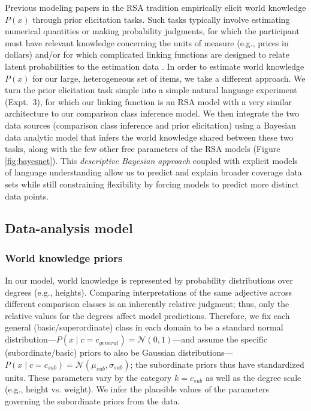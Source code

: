 \documentclass[doc]{apa6}
\begin{document}
Previous modeling papers in the RSA tradition empirically elicit world knowledge $P(x)$ through prior elicitation tasks.
Such tasks typically involve estimating numerical quantities or making probability judgments, for which the participant must have relevant knowledge concerning the units of measure (e.g., prices in dollars) and/or for which complicated linking functions are designed to relate latent probabilities to the estimation data \cite{Franke2016}. 
In order to estimate world knowledge $P(x)$ for our large, heterogeneous set of items, we take a different approach.
We turn the prior elicitation task simple into a simple natural language experiment (Expt.~3), for which our linking function is an RSA model with a very similar architecture to our comparison class inference model. 
We then integrate the two data sources (comparison class inference and prior elicitation) using a Bayesian data analytic model that infers the world knowledge shared between these two tasks, along with the few other free parameters of the RSA models (Figure \ref{fig:bayesnet}). 
This \emph{descriptive Bayesian approach} \cite{tauber2017} coupled with explicit models of language understanding allow us to predict and explain broader coverage data sets while still constraining flexibility by forcing models to predict more distinct data points. 

\subsection{Data-analysis model}

\subsubsection{World knowledge priors}

In our model, world knowledge is represented by probability distributions over degrees (e.g., heights).
Comparing interpretations of the same adjective across different comparison classes is an inherently relative judgment; thus, only the relative values for the degrees affect model predictions. 
Therefore, we fix each general (basic/superordinate) class in each domain to be a standard normal distribution---$P(x \mid c = c_{general}) = \mathcal{N}(0, 1)$---and assume the specific (subordinate/basic) priors to also be Gaussian distributions---\(P(x \mid c = c_{sub}) = \mathcal{N}(\mu_{sub}, \sigma_{sub})\); the subordinate priors thus have standardized units.
These parameters vary by the category $k = c_{sub}$ as well as the degree scale (e.g., height vs. weight).
We infer the plausible values of the parameters governing the subordinate priors from the data.
\end{document}
